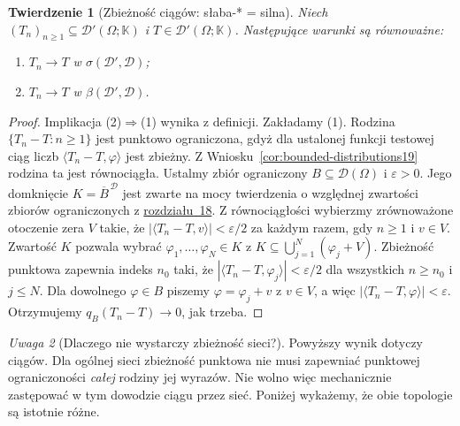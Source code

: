 \documentclass[11pt,a4paper]{article}
\numberwithin{equation}{section}
\theoremstyle{plain}
\newtheorem{twierdzenie}{Twierdzenie}[section]
\theoremstyle{definition}
\theoremstyle{remark}
\newtheorem{uwaga}[twierdzenie]{Uwaga}
\newcommand{\K}{\mathbb K}
\begin{document}
\begin{twierdzenie}[Zbieżność ciągów: słaba-* = silna]
\label{thm:weak-strong-sequences19}
Niech $(T_n)_{n\ge1}\subseteq\mathcal D'(\Omega;\K)$
i $T\in\mathcal D'(\Omega;\K)$. Następujące warunki
są równoważne:
\begin{enumerate}
\item $T_n\to T$ w $\sigma(\mathcal D',\mathcal D)$;
\item $T_n\to T$ w $\beta(\mathcal D',\mathcal D)$.
\end{enumerate}
\end{twierdzenie}
\begin{proof}
Implikacja (2)$\Rightarrow$(1) wynika z definicji.
Zakładamy (1). Rodzina $\{T_n-T:n\ge1\}$ jest
punktowo ograniczona, gdyż dla ustalonej funkcji
testowej ciąg liczb $\langle T_n-T,\varphi\rangle$
jest zbieżny. Z Wniosku~\ref{cor:bounded-distributions19}
rodzina ta jest równociągła. Ustalmy zbiór ograniczony
$B\subseteq\mathcal D(\Omega)$ i $\varepsilon>0$.
Jego domknięcie $K=\overline B^{\,\mathcal D}$ jest zwarte
na mocy twierdzenia o względnej zwartości zbiorów ograniczonych z \hyperref[sec:funkcje-testowe18]{rozdziału~18}.
Z równociągłości wybierzmy zrównoważone otoczenie
zera $V$ takie, że
$|\langle T_n-T,v\rangle|<\varepsilon/2$
za każdym razem, gdy $n\ge1$ i $v\in V$.
Zwartość $K$ pozwala wybrać
$\varphi_1,\ldots,\varphi_N\in K$ z
$K\subseteq\bigcup_{j=1}^N(\varphi_j+V)$.
Zbieżność punktowa zapewnia indeks $n_0$ taki, że
$|\langle T_n-T,\varphi_j\rangle|<\varepsilon/2$
dla wszystkich $n\ge n_0$ i $j\le N$.
Dla dowolnego $\varphi\in B$ piszemy
$\varphi=\varphi_j+v$ z $v\in V$, a więc
$|\langle T_n-T,\varphi\rangle|<\varepsilon$.
Otrzymujemy $q_B(T_n-T)\to0$, jak trzeba.
\end{proof}

\begin{uwaga}[Dlaczego nie wystarczy zbieżność sieci?]
\label{rem:net-distinction19}
Powyższy wynik dotyczy ciągów. Dla ogólnej sieci
zbieżność punktowa nie musi zapewniać punktowej
ograniczoności \emph{całej} rodziny jej wyrazów.
Nie wolno więc mechanicznie zastępować w tym dowodzie
ciągu przez sieć. Poniżej wykażemy, że obie topologie
są istotnie różne.
\end{uwaga}
\end{document}

